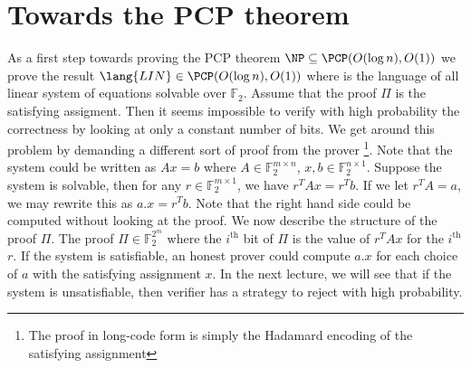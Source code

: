 \documentclass[11pt]{article}
\begin{document}
\section{Towards the PCP theorem}
As a first step towards proving the PCP theorem $\NP \subseteq \PCP(O(\log n), O(1))$ we prove the result 
$\lang{LIN} \in \PCP(O(\log n), O(1))$ where  is the language of all linear system of equations 
solvable over $\mathbb{F}_2$. Assume that the proof $\Pi$ is the satisfying assigment. Then it seems impossible 
to verify with high probability the correctness by looking at only a constant number of bits. We get around 
this problem by demanding a different sort of proof from the prover \footnote{The proof in long-code form is simply the 
Hadamard encoding of the satisfying assignment}. Note that the system could be written as 
$Ax = b$ where $A \in \mathbb{F}_{2}^{m \times n}$, $x, b \in \mathbb{F}_{2}^{n \times 1}$. Suppose the 
system is solvable, then for any $r \in \mathbb{F}_{2}^{m \times 1}$, we have $r^{T}Ax = r^{T}b$. If we 
let $r^{T}A = a$, we may rewrite this as $a.x = r^{T}b$. Note that the right hand side could be computed 
without looking at the proof. We now describe the structure of the proof $\Pi$. 
The proof $\Pi \in \mathbb{F}_{2}^{2^m}$ where the $i^{\textrm{th}}$ bit of $\Pi$ is the value 
of $r^{T}Ax$ for the $i^{\textrm{th}}$ $r$. If the system is satisfiable, an honest prover could compute $a.x$ for 
each choice of $a$ with the satisfying assignment $x$. In the next lecture, we will see that if the system is 
unsatisfiable, then verifier has a strategy to reject with high probability.
\end{document}
